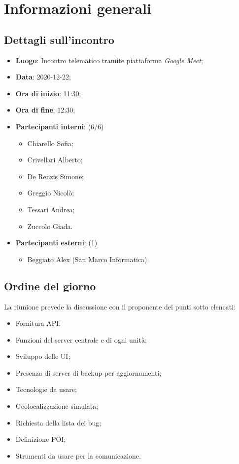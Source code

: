 \section{Informazioni generali}

\subsection{Dettagli sull'incontro}
\begin{itemize}
\item \textbf{Luogo}: Incontro telematico tramite piattaforma \textit{Google Meet};
\item \textbf{Data}: 2020-12-22;
\item \textbf{Ora di inizio}: 11:30;
\item \textbf{Ora di fine}: 12:30;
\item \textbf{Partecipanti interni}: (6/6) 
\begin{itemize}
	\item Chiarello Sofia;
	\item Crivellari Alberto;
	\item De Renzis Simone;
	\item Greggio Nicolò;
	\item Tessari Andrea;
	\item Zuccolo Giada.
\end{itemize}
\item \textbf{Partecipanti esterni}: (1) 
\begin{itemize}
	\item Beggiato Alex (San Marco Informatica)
\end{itemize}
\end{itemize}

\subsection{Ordine del giorno}

La riunione prevede la discussione con il proponente dei punti sotto elencati:
\begin{itemize}
	\item Fornitura API;
	\item Funzioni del server centrale e di ogni unità;
	\item Sviluppo delle UI;
	\item Presenza di server di backup per aggiornamenti;
	\item Tecnologie da usare;
	\item Geolocalizzazione simulata;
	\item Richiesta della lista dei bug;
	\item Definizione POI;
	\item Strumenti da usare per la comunicazione.
\end{itemize}




